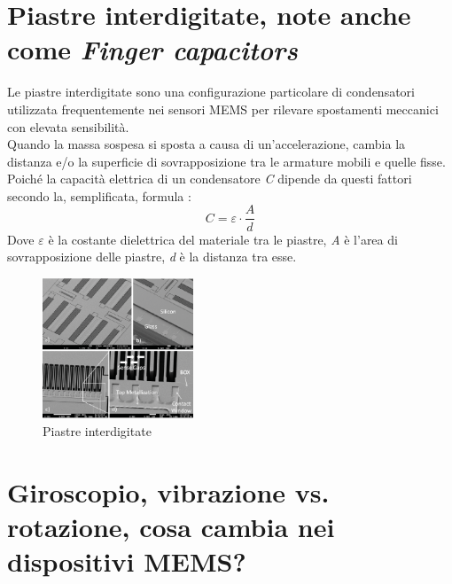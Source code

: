 \documentclass[11pt]{report}
\begin{document}
\section{Piastre interdigitate, note anche come \textit{Finger capacitors}}
Le piastre interdigitate sono una configurazione particolare di condensatori utilizzata frequentemente nei sensori MEMS per rilevare spostamenti meccanici con elevata sensibilità.\\
Quando la massa sospesa si sposta a causa di un'accelerazione, cambia la distanza e/o la superficie di sovrapposizione tra le armature mobili e quelle fisse. Poiché la capacità elettrica di un 
condensatore \textit{C} dipende da questi fattori secondo la, semplificata, formula :\\
\begin{equation}
    C = \varepsilon \cdot \frac{\textit{A}}{\textit{d}}
\end{equation}
Dove $\varepsilon$ è la costante dielettrica del materiale tra le piastre, \textit{A} è l'area di sovrapposizione delle piastre, \textit{d} è la distanza tra esse.\\

\begin{figure}[H]
    \centering
    \includegraphics[width = 0.4\textwidth]{images/IMMAGINE_A_1_piastre_inerdigitate .png}
    \caption{Piastre interdigitate}
    \label{fig:etichetta}
\end{figure}
\section{Giroscopio, vibrazione vs. rotazione, cosa cambia nei dispositivi MEMS?}

 
\end{document}
